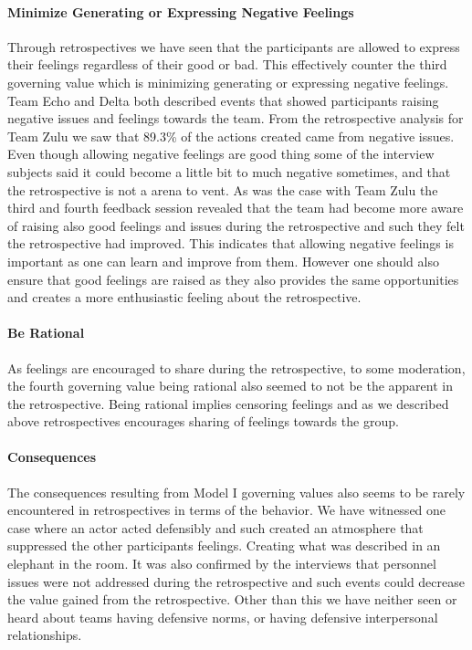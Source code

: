 \paragraph{Minimize Generating or Expressing Negative Feelings}
Through retrospectives we have seen that the participants are allowed to express their feelings regardless of their good or bad. This effectively counter the third governing value which is minimizing generating or expressing negative feelings. Team Echo and Delta both described events that showed participants raising negative issues and feelings towards the team. From the retrospective analysis for Team Zulu we saw that 89.3\% of the actions created came from negative issues. Even though allowing negative feelings are good thing some of the interview subjects said it could become a little bit to much negative sometimes, and that the retrospective is not a arena to vent. As was the case with Team Zulu the third and fourth feedback session revealed that the team had become more aware of raising also good feelings and issues during the retrospective and such they felt the retrospective had improved. This indicates that allowing negative feelings is important as one can learn and improve from them. However one should also ensure that good feelings are raised as they also provides the same opportunities and creates a more enthusiastic feeling about the retrospective.

\paragraph{Be Rational}
As feelings are encouraged to share during the retrospective, to some moderation, the fourth governing value being rational also seemed to not be the apparent in the retrospective. Being rational implies censoring feelings and as we described above retrospectives encourages sharing of feelings towards the group. 

\paragraph{Consequences}
The consequences resulting from Model I governing values also seems to be rarely encountered in retrospectives in terms of the behavior. We have witnessed one case where an actor acted defensibly and such created an atmosphere that suppressed the other participants feelings. Creating what was described in an elephant in the room. It was also confirmed by the interviews that personnel issues were not addressed during the retrospective and such events could decrease the value gained from the retrospective. Other than this we have neither seen or heard about teams having defensive norms, or having defensive interpersonal relationships. 

